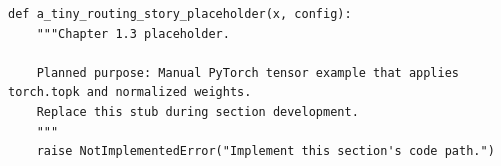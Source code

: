 \begin{lstlisting}[style=bookpython,caption={Planned code placeholder for a tiny routing story.},label={lst:ch01-a-tiny-routing-story}]
def a_tiny_routing_story_placeholder(x, config):
    """Chapter 1.3 placeholder.

    Planned purpose: Manual PyTorch tensor example that applies torch.topk and normalized weights.
    Replace this stub during section development.
    """
    raise NotImplementedError("Implement this section's code path.")
\end{lstlisting}
